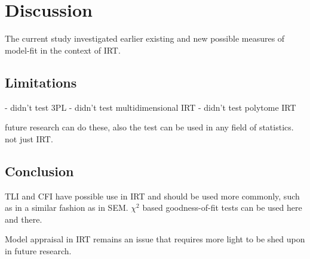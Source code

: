 \documentclass[Royal,sageapa,times,doublespace]{sagej}
\begin{document}
\section{Discussion}

The current study investigated earlier existing and new possible measures of model-fit in the context of IRT. 

\subsection{Limitations}

- didn't test 3PL
- didn't test multidimensional IRT
- didn't test polytome IRT

future research can do these, also the test can be used in any field of statistics. not just IRT.


\subsection{Conclusion}

TLI and CFI have possible use in IRT and should be used more commonly, such as in a similar fashion as in SEM. $\chi^2$ based goodness-of-fit tests can be used here and there. 

Model appraisal in IRT remains an issue that requires more light to be shed upon in future research. 

\newpage

\nocite{*}


\end{document}
